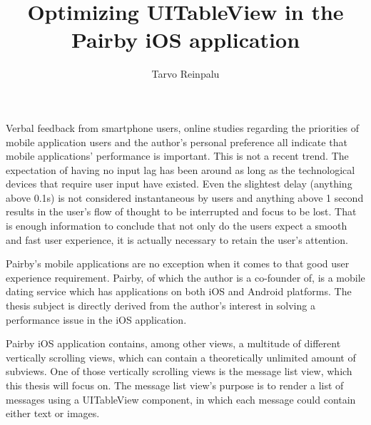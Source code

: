\documentclass[a4paper,12pt]{article}
\begin{document}
\begin{itkTitlePage}
\title{Optimizing UITableView in the Pairby iOS application}
\author{Tarvo Reinpalu}
\end{itkTitlePage}




\itkMakeAuthorDeclaration

\clearpage
\thispagestyle{empty}
\setcounter{tocdepth}{2}
\tableofcontents
\newpage




\newpage
{}
Verbal feedback from smartphone users, online studies regarding the priorities of mobile application users\cite{AppSpeedStudyHP}\cite{AppSpeedStudyApigee} and the author's personal preference all indicate that mobile applications' performance is important. This is not a recent trend. The expectation of having no input lag has been around as long as the technological devices that require user input have existed.\cite{NielsenUsabilityEngineering} Even the slightest delay (anything above 0.1s) is not considered instantaneous by users and anything above 1 second results in the user's flow of thought to be interrupted and focus to be lost.\cite{NielsenUsabilityEngineering} That is enough information to conclude that not only do the users expect a smooth and fast user experience, it is actually necessary to retain the user's attention.

Pairby's mobile applications are no exception when it comes to that good user experience requirement. Pairby, of which the author is a co-founder of, is a mobile dating service which has applications on both iOS and Android platforms. The thesis subject is directly derived from the author's interest in solving a performance issue in the iOS application.

Pairby iOS application contains, among other views, a multitude of different vertically scrolling views, which can contain a theoretically unlimited amount of subviews. One of those vertically scrolling views is the message list view, which this thesis will focus on. The message list view's purpose is to render a list of messages using a UITableView component, in which each message could contain either text or images.
\end{document}
